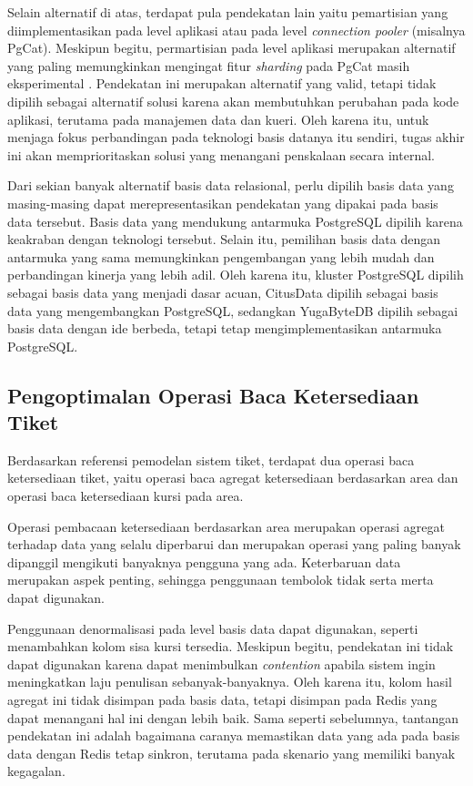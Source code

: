Selain alternatif di atas, terdapat pula pendekatan lain yaitu pemartisian yang diimplementasikan pada level aplikasi atau pada level \textit{connection pooler} (misalnya PgCat). Meskipun begitu, permartisian pada level aplikasi merupakan alternatif yang paling memungkinkan mengingat fitur \textit{sharding} pada PgCat masih eksperimental \parencite{pgcat}. Pendekatan ini merupakan alternatif yang valid, tetapi tidak dipilih sebagai alternatif solusi karena akan membutuhkan perubahan pada kode aplikasi, terutama pada manajemen data dan kueri. Oleh karena itu, untuk menjaga fokus perbandingan pada teknologi basis datanya itu sendiri, tugas akhir ini akan memprioritaskan solusi yang menangani penskalaan secara internal.

Dari sekian banyak alternatif basis data relasional, perlu dipilih basis data yang masing-masing dapat merepresentasikan pendekatan yang dipakai pada basis data tersebut. Basis data yang mendukung antarmuka PostgreSQL dipilih karena keakraban dengan teknologi tersebut. Selain itu, pemilihan basis data dengan antarmuka yang sama memungkinkan pengembangan yang lebih mudah dan perbandingan kinerja yang lebih adil. Oleh karena itu, kluster PostgreSQL dipilih sebagai basis data yang menjadi dasar acuan, CitusData dipilih sebagai basis data yang mengembangkan PostgreSQL, sedangkan YugaByteDB dipilih sebagai basis data dengan ide berbeda, tetapi tetap mengimplementasikan antarmuka PostgreSQL.

\subsection{Pengoptimalan Operasi Baca Ketersediaan Tiket}

Berdasarkan referensi pemodelan sistem tiket, terdapat dua operasi baca ketersediaan tiket, yaitu operasi baca agregat ketersediaan berdasarkan area dan operasi baca ketersediaan kursi pada area.

Operasi pembacaan ketersediaan berdasarkan area merupakan operasi agregat terhadap data yang selalu diperbarui dan merupakan operasi yang paling banyak dipanggil mengikuti banyaknya pengguna yang ada. Keterbaruan data merupakan aspek penting, sehingga penggunaan tembolok tidak serta merta dapat digunakan.

Penggunaan denormalisasi pada level basis data dapat digunakan, seperti menambahkan kolom sisa kursi tersedia. Meskipun begitu, pendekatan ini tidak dapat digunakan karena dapat menimbulkan \textit{contention} apabila sistem ingin meningkatkan laju penulisan sebanyak-banyaknya. Oleh karena itu, kolom hasil agregat ini tidak disimpan pada basis data, tetapi disimpan pada Redis yang dapat menangani hal ini dengan lebih baik. Sama seperti sebelumnya, tantangan pendekatan ini adalah bagaimana caranya memastikan data yang ada pada basis data dengan Redis tetap sinkron, terutama pada skenario yang memiliki banyak kegagalan.

